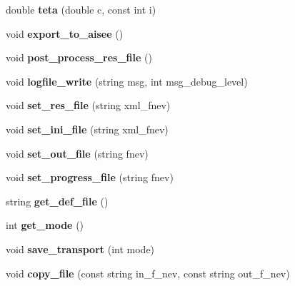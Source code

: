 \begin{DoxyCompactItemize}
\hypertarget{class_staci_a2ae0957cb2159f7417175379bac09d95}{}\label{class_staci_a2ae0957cb2159f7417175379bac09d95} 
double {\bfseries teta} (double c, const int i)
\item 
\hypertarget{class_staci_a7c79de7b27f86ef08e48eef757e895fa}{}\label{class_staci_a7c79de7b27f86ef08e48eef757e895fa} 
void {\bfseries export\+\_\+to\+\_\+aisee} ()
\item 
\hypertarget{class_staci_ac0af3f19c34f3a08e4892cebdc5e0340}{}\label{class_staci_ac0af3f19c34f3a08e4892cebdc5e0340} 
void {\bfseries post\+\_\+process\+\_\+res\+\_\+file} ()
\item 
\hypertarget{class_staci_af0d4816a00fec9373f469a7854f09a0e}{}\label{class_staci_af0d4816a00fec9373f469a7854f09a0e} 
void {\bfseries logfile\+\_\+write} (string msg, int msg\+\_\+debug\+\_\+level)
\item 
\hypertarget{class_staci_a03c12265bef1640238ffe1efdb0a2556}{}\label{class_staci_a03c12265bef1640238ffe1efdb0a2556} 
void {\bfseries set\+\_\+res\+\_\+file} (string xml\+\_\+fnev)
\item 
\hypertarget{class_staci_a2939f5a02b2d06e21be553d31a15106c}{}\label{class_staci_a2939f5a02b2d06e21be553d31a15106c} 
void {\bfseries set\+\_\+ini\+\_\+file} (string xml\+\_\+fnev)
\item 
\hypertarget{class_staci_a80220c0c3baa490866bd2fc15698a8d1}{}\label{class_staci_a80220c0c3baa490866bd2fc15698a8d1} 
void {\bfseries set\+\_\+out\+\_\+file} (string fnev)
\item 
\hypertarget{class_staci_a00500602fabd3f2cdc0bd7fedc845787}{}\label{class_staci_a00500602fabd3f2cdc0bd7fedc845787} 
void {\bfseries set\+\_\+progress\+\_\+file} (string fnev)
\item 
\hypertarget{class_staci_a61dc8ef1b4e1561938e6cc39917b346f}{}\label{class_staci_a61dc8ef1b4e1561938e6cc39917b346f} 
string {\bfseries get\+\_\+def\+\_\+file} ()
\item 
\hypertarget{class_staci_a0c822a9effbcf4dd88b82f68b38c0498}{}\label{class_staci_a0c822a9effbcf4dd88b82f68b38c0498} 
int {\bfseries get\+\_\+mode} ()
\item 
\hypertarget{class_staci_a9c1d34d2dc05eaad3c5ba60d5ebfa5a1}{}\label{class_staci_a9c1d34d2dc05eaad3c5ba60d5ebfa5a1} 
void {\bfseries save\+\_\+transport} (int mode)
\item 
\hypertarget{class_staci_ac38df6cb7fb51eb595c17cd050a85073}{}\label{class_staci_ac38df6cb7fb51eb595c17cd050a85073} 
void {\bfseries copy\+\_\+file} (const string in\+\_\+f\+\_\+nev, const string out\+\_\+f\+\_\+nev)

\end{DoxyCompactItemize}
